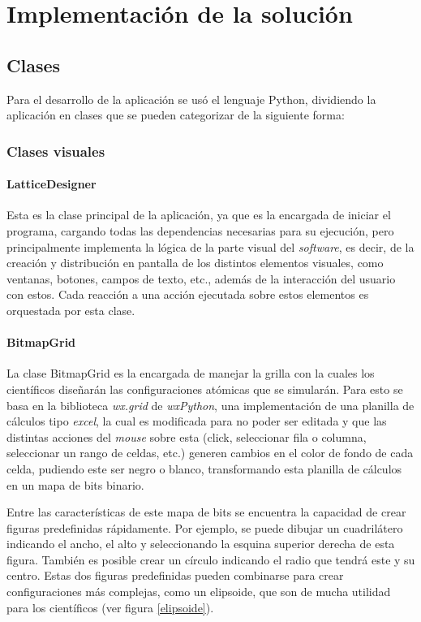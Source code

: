 \chapter{Implementación de la solución}
\label{chapter:implementacion}

\section{Clases}

Para el desarrollo de la aplicación se usó el lenguaje Python, dividiendo la aplicación en clases que se pueden categorizar de la siguiente forma:

\subsection{Clases visuales}

\subsubsection{LatticeDesigner}
Esta es la clase principal de la aplicación, ya que es la encargada de iniciar el programa, cargando todas las dependencias necesarias para su ejecución, pero principalmente implementa la lógica de la parte visual del \emph{software}, es decir, de la creación y distribución en pantalla de los distintos elementos visuales, como ventanas, botones, campos de texto, etc., además de la interacción del usuario con estos. Cada reacción a una acción ejecutada sobre estos elementos es orquestada por esta clase.

\subsubsection{BitmapGrid}
La clase BitmapGrid es la encargada de manejar la grilla con la cuales los científicos diseñarán las configuraciones atómicas que se simularán. Para esto se basa en la biblioteca \emph{wx.grid} de \emph{wxPython}, una implementación de una planilla de cálculos tipo \emph{excel}, la cual es modificada para no poder ser editada y que las distintas acciones del \emph{mouse} sobre esta (click, seleccionar fila o columna, seleccionar un rango de celdas, etc.) generen cambios en el color de fondo de cada celda, pudiendo este ser negro o blanco, transformando esta planilla de cálculos en un mapa de bits binario.

Entre las características de este mapa de bits se encuentra la capacidad de crear figuras predefinidas rápidamente. Por ejemplo, se puede dibujar un cuadrilátero indicando el ancho, el alto y seleccionando la esquina superior derecha de esta figura. También es posible crear un círculo indicando el radio que tendrá este y su centro. Estas dos figuras predefinidas pueden combinarse para crear configuraciones más complejas, como un elipsoide, que son de mucha utilidad para los científicos (ver figura \ref{elipsoide}).

